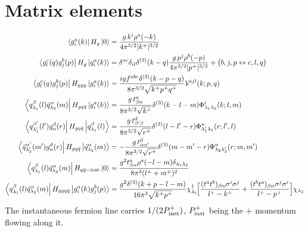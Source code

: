 \documentclass[11pt]{article}
\newcommand{\dg}{\dagger}
\newcommand{\dthree}{\delta^{(3)}}
\newcommand{\ket}[1]{\left|#1\right\rangle}
\newcommand{\bra}[1]{\left\langle#1\right|}
\newcommand{\vac}{\ket{0}}
\newcommand{\Ph}{\Phi}
\newcommand{\Vg}{\mathcal{V}}
\newcommand{\qk}[3]{q^{#1}_{#2}(#3)}
\newcommand{\aqk}[3]{\bar q^{#1}_{#2}(#3)}
\newcommand{\gl}[3]{g^{#1}_{#2}(#3)}
\begin{document}
\appendix
\section{Matrix elements}
\label{app:me}
\begin{align}
\bra{\gl{a}{i}{k}}H_{g}\vac&=\frac{g\,k^{i}\rho^{a}(-k)}{4\pi^{3/2}|k^{+}|^{3/2}}
\label{eq:MEg}\\
\bra{\gl{c}{l}{q}\gl{b}{j}{p}}H_{g}\ket{\gl{a}{i}{k}}&=
\delta^{ac}\delta_{il}\dthree(k-q)\frac{g\,p^{j}\rho^{b}(-p)}{4\pi^{3/2}|p^{+}|^{3/2}}
+\big(b,j,p\leftrightarrow c,l,q\big)
\label{eq:MEg2}\\
\bra{\gl{c}{l}{q}\gl{b}{j}{p}}H_{ggg}\ket{\gl{a}{i}{k}}&=
\frac{igf^{abc}\dthree(k-p-q)}{8\pi^{3/2}\sqrt{k^{+}p^{+}q^{+}}}\Vg^{ijl}(k;p,q)
\label{eq:MEggg}\\
\bra{\qk{\beta}{\lambda_{1}}{l}\aqk{\alpha}{\lambda_{2}}{m}}H_{gq\bar q}\ket{\gl{a}{i}{k}}&=
\frac{g\,t^{a}_{\beta\alpha}}{8\pi^{3/2}\sqrt{k^{+}}}\dthree(k-l-m)
\Ph^{i}_{\lambda_{1}\lambda_{2}}(k;l,m)
\label{eq:MEqqg}\\
\bra{\qk{\beta'}{\lambda_{1}'}{l'}\gl{d}{n}{r}}H_{gq\bar q}\ket{\qk{\beta}{\lambda_{1}}{l}}&=
\frac{g\,t^{d}_{\beta'\beta}}{8\pi^{3/2}\sqrt{r^{+}}}\dthree(l-l'-r)
\Ph^{n}_{\lambda_{1}'\lambda_{1}}(r;l',l)
\label{eq:MEqg}\\
\bra{\aqk{\alpha'}{\lambda_{2}'}{m'}\gl{d}{n}{r}}H_{gq\bar q}\ket{\aqk{\alpha}{\lambda_{2}}{m}}&=
-\frac{g\,t^{d}_{\alpha\alpha'}}{8\pi^{3/2}\sqrt{r^{+}}}\dthree(m-m'-r)
\Ph^{n}_{\lambda_{2}\lambda_{2}'}(r;m,m')
\label{eq:MEaqg}\\
\bra{\qk{\beta}{\lambda_{1}}{l}\aqk{\alpha}{\lambda_{2}}{m}}H_{q\bar q-\rm inst}\vac&=
\frac{g^{2}t^{a}_{\beta\alpha}\rho^{a}(-l-m)\delta_{\lambda_{1}\lambda_{2}}}
{8\pi^{3}(l^{+}+m^{+})^{2}}
\label{eq:MEinst}\\
\bra{\qk{\beta}{\lambda_{1}}{l}\aqk{\alpha}{\lambda_{2}}{m}}H_{ggq\bar q}\ket{\gl{a}{i}{k}\gl{b}{j}{p}}&=
\frac{g^{2}\dthree(k+p-l-m)}{16\pi^{3}\sqrt{k^{+}p^{+}}}
\chi^{\dg}_{\lambda_{1}}\!\Big[\frac{(t^{a}t^{b})_{\beta\alpha}\sigma^{i}\sigma^{j}}{l^{+}-k^{+}}
+\frac{(t^{b}t^{a})_{\beta\alpha}\sigma^{j}\sigma^{i}}{l^{+}-p^{+}}\Big]\chi_{\lambda_{2}}
\end{align}
The instantaneous fermion line carries $1/(2P^{+}_{\rm inst})$, $P^{+}_{\rm inst}$ being the $+$
momentum flowing along it.

\end{document}
